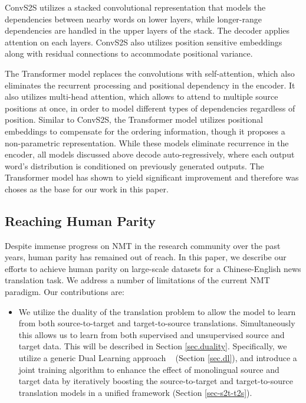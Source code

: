 \documentclass[a4paper]{article}
\begin{document}
\begin{CJK*}{UTF8}{gbsn}
ConvS2S utilizes a stacked convolutional representation that models the dependencies between nearby words on lower layers, while longer-range dependencies are handled in the upper layers of the stack. The decoder applies attention on each layers. ConvS2S also utilizes position sensitive embeddings along with residual connections to accommodate positional variance.

The Transformer model replaces the convolutions with self-attention, which also eliminates the recurrent processing and positional dependency in the encoder. It also utilizes multi-head attention, which allows to attend to multiple source positions at once, in order to model different types of dependencies regardless of position. Similar to ConvS2S, the Transformer model utilizes positional embeddings to compensate for the ordering information, though it proposes a non-parametric representation. While these models eliminate recurrence in the encoder, all models discussed above decode auto-regressively, where each output word's distribution is conditioned on previously generated outputs. The Transformer model has shown \cite{vaswani2017attention} to yield significant improvement and therefore was choses as the base for our work in this paper.


\subsection{Reaching Human Parity}

Despite immense progress on NMT in the research community over the past years, human parity has remained out of reach. In this paper, we describe our efforts to achieve human parity on large-scale datasets for a Chinese-English news translation task. We  address a number of limitations of the current NMT paradigm. Our contributions are:
\begin{itemize}
\item We utilize the duality of the translation problem to allow the model to learn from both source-to-target and target-to-source translations. Simultaneously this allows us to learn from both supervised and unsupervised source and target data. This will be described in Section \ref{sec.duality}. Specifically, we utilize a generic Dual Learning approach ~\cite{dualNMT,DSL,dualInfer}   (Section \ref{sec.dl}), and introduce a joint training algorithm to enhance the effect of monolingual source and target data by iteratively boosting the  source-to-target and target-to-source translation models in a unified framework (Section \ref{sec-s2t-t2s}).


\end{itemize}
\end{CJK*}
\end{document}

